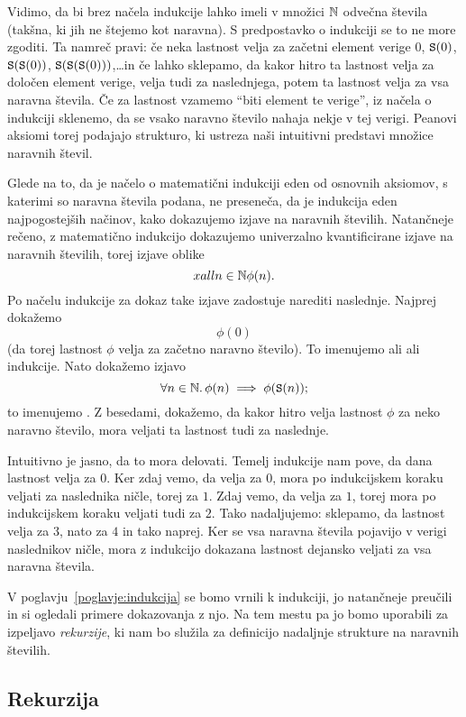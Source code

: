 Vidimo, da bi brez načela indukcije lahko imeli v množici $\mathbb{N}$ odvečna števila (takšna, ki jih ne štejemo kot naravna). S predpostavko o indukciji se to ne more zgoditi. Ta namreč pravi: če neka lastnost velja za začetni element verige $0$, $\mathtt{S}(0)$, $\mathtt{S}(\mathtt{S}(0))$, $\mathtt{S}(\mathtt{S}(\mathtt{S}(0)))$,\ldots in če lahko sklepamo, da kakor hitro ta lastnost velja za določen element verige, velja tudi za naslednjega, potem ta lastnost velja za vsa naravna števila. Če za lastnost vzamemo ``biti element te verige'', iz načela o indukciji sklenemo, da se vsako naravno število nahaja nekje v tej verigi. Peanovi aksiomi torej podajajo strukturo, ki ustreza naši intuitivni predstavi množice naravnih števil.

Glede na to, da je načelo o matematični indukciji eden od osnovnih aksiomov, s katerimi so naravna števila podana, ne preseneča, da je indukcija eden najpogostejših načinov, kako dokazujemo izjave na naravnih številih. Natančneje rečeno, z matematično indukcijo dokazujemo univerzalno kvantificirane izjave na naravnih številih, torej izjave oblike
\[xall{n \in \mathbb{N}} \phi(n).\]
Po načelu indukcije za dokaz take izjave zadostuje narediti naslednje. Najprej dokažemo
\[\phi(0)\]
(da torej lastnost $\phi$ velja za začetno naravno število). To imenujemo  ali  ali  indukcije. Nato dokažemo izjavo
\[\forall n \in \mathbb{N} .\, \phi(n) \implies \phi(\mathtt{S}(n));\]
to imenujemo . Z besedami, dokažemo, da kakor hitro velja lastnost $\phi$ za neko naravno število, mora veljati ta lastnost tudi za naslednje.

Intuitivno je jasno, da to mora delovati. Temelj indukcije nam pove, da dana lastnost velja za $0$. Ker zdaj vemo, da velja za $0$, mora po indukcijskem koraku veljati za naslednika ničle, torej za $1$. Zdaj vemo, da velja za $1$, torej mora po indukcijskem koraku veljati tudi za $2$. Tako nadaljujemo: sklepamo, da lastnost velja za $3$, nato za $4$ in tako naprej. Ker se vsa naravna števila pojavijo v verigi naslednikov ničle, mora z indukcijo dokazana lastnost dejansko veljati za vsa naravna števila.

V poglavju~\ref{poglavje:indukcija} se bomo vrnili k indukciji, jo natančneje preučili in si ogledali primere dokazovanja z njo. Na tem mestu pa jo bomo uporabili za izpeljavo \emph{rekurzije}, ki nam bo služila za definicijo nadaljnje strukture na naravnih številih.

\subsection{Rekurzija}

